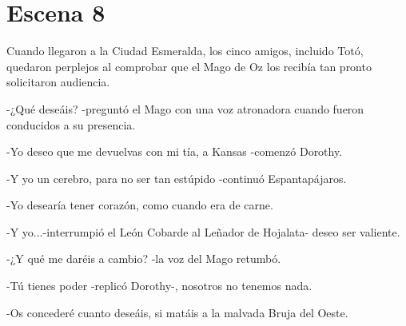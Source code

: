 \chapter{Escena 8}
Cuando llegaron a la Ciudad Esmeralda, los cinco amigos, incluido Totó, quedaron perplejos al comprobar que el Mago de Oz los recibía tan pronto solicitaron audiencia.

-¿Qué deseáis? -preguntó el Mago con una voz atronadora cuando fueron conducidos a su presencia. 

-Yo deseo que me devuelvas con mi tía, a Kansas -comenzó Dorothy.

-Y yo un cerebro, para no ser tan estúpido -continuó Espantapájaros.

-Yo desearía tener corazón, como cuando era de carne.

-Y yo...-interrumpió el León Cobarde al Leñador de Hojalata- deseo ser valiente.

-¿Y qué me daréis a cambio? -la voz del Mago retumbó.

-Tú tienes poder -replicó Dorothy-, nosotros no tenemos nada.
 
-Os concederé cuanto deseáis, si matáis a la malvada Bruja del Oeste.